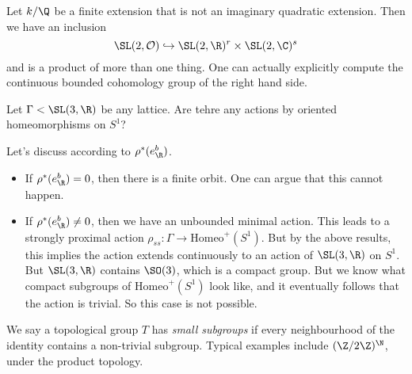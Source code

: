 \documentclass[a4paper]{article}
\newcommand\Homeo{\mathrm{Homeo}}
\begin{document}
\begin{eg}
  Let $k/\Q$ be a finite extension that is not an imaginary quadratic extension. Then we have an inclusion
  \[
    \SL(2, \mathcal{O}) \hookrightarrow \SL(2, \R)^r \times \SL(2, \C)^s
  \]
  and is a product of more than one thing. One can actually explicitly compute the continuous bounded cohomology group of the right hand side.
\end{eg}

\begin{ex}
  Let $\Gamma < \SL(3, \R)$ be any lattice. Are tehre any actions by oriented homeomorphisms on $S^1$?

  Let's discuss according to $\rho^*(e^b_\R)$.
  \begin{itemize}
    \item If $\rho^*(e^b_\R) = 0$, then there is a finite orbit. One can argue that this cannot happen. %
    \item If $\rho^*(e^b_\R) \not= 0$, then we have an unbounded minimal action. This leads to a strongly proximal action $\rho_{ss}: \Gamma \to \Homeo^+(S^1)$. But by the above results, this implies the action extends continuously to an action of $\SL(3, \R)$ on $S^1$. But $\SL(3, \R)$ contains $\SO(3)$, which is a compact group. But we know what compact subgroups of $\Homeo^+(S^1)$ look like, and it eventually follows that the action is trivial. So this case is not possible.
  \end{itemize}
\end{ex}

We say a topological group $T$ has \emph{small subgroups} if every neighbourhood of the identity contains a non-trivial subgroup. Typical examples include $(\Z/2\Z)^\N$, under the product topology.

\printindex
\end{document}
